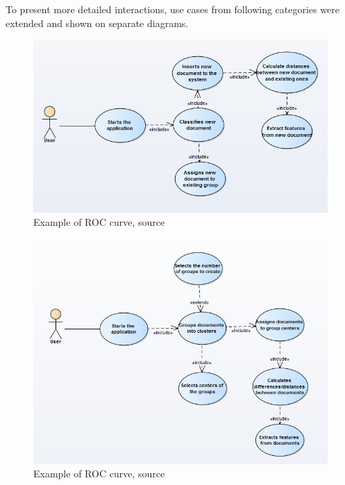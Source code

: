 To present more detailed interactions, use cases from following categories were extended and shown on separate diagrams.
\begin{figure}[H]
	\begin{center}
		\includegraphics[width=1.0\linewidth]{images/diagrams/use-case/use-case-11.PNG}
		\caption{Example of ROC curve, source \cite{roc-curve}}
		\label{design-use-case-1}
	\end{center}
\end{figure}

\begin{figure}[H]
	\begin{center}
		\includegraphics[width=1.0\linewidth]{images/diagrams/use-case/use-case-22.PNG}
		\caption{Example of ROC curve, source \cite{roc-curve}}
		\label{design-use-case-2}
	\end{center}
\end{figure}
 
